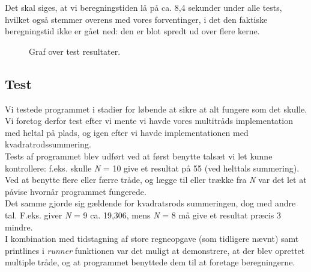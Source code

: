 \documentclass[main.tex]{subfile}
\begin{document}
Det skal siges, at vi beregningstiden lå på ca. 8,4 sekunder under alle tests, hvilket også stemmer overens med vores forventinger, i det den faktiske beregningstid ikke er gået ned: den er blot spredt ud over flere kerne.

\begin{figure}[H]
\center
{}
\caption{Graf over test resultater.}
\label{fig:opg2_2_test}
\end{figure}

\subsection{Test}
Vi testede programmet i stadier for løbende at sikre at alt fungere som det skulle. Vi foretog derfor test efter vi mente vi havde vores multitråds implementation med heltal på plads, og igen efter vi havde implementationen med kvadratrodssummering.\\

Tests af programmet blev udført ved at først benytte talsæt vi let kunne kontrollere: f.eks. skulle \textit{N} = 10 give et resultat på 55 (ved helttals summering). Ved at benytte flere eller færre tråde, og lægge til eller trække fra \textit{N} var det let at påvise hvornår programmet fungerede.\\

Det samme gjorde sig gældende for kvadratsrods summeringen, dog med andre tal. F.eks. giver \textit{N} = 9 ca. 19,306, mens \textit{N} = 8 må give et resultat præcis 3 mindre.\\

I kombination med tidstagning af store regneopgave (som tidligere nævnt) samt printlines i \textit{runner} funktionen var det muligt at demonstrere, at der blev oprettet multiple tråde, og at programmet benyttede dem til at foretage beregningerne.
\end{document}
